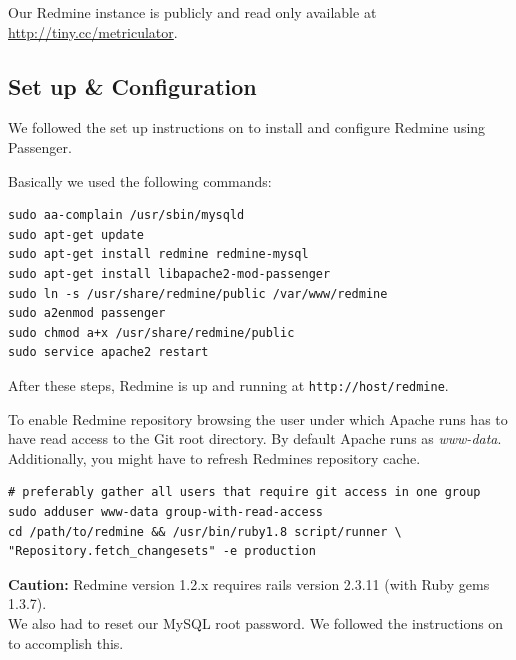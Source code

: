 \documentclass[11pt,a4paper,oneside]{scrreprt}
\begin{document}
Our Redmine instance is publicly and read only available at \url{http://tiny.cc/metriculator}.

\subsection{Set up \& Configuration}
We followed the set up instructions on \cite{redminesetup} to install and configure Redmine using Passenger.

Basically we used the following commands:
\begin{lstlisting}[style=console, caption=Redmine set up commands]
sudo aa-complain /usr/sbin/mysqld
sudo apt-get update
sudo apt-get install redmine redmine-mysql
sudo apt-get install libapache2-mod-passenger
sudo ln -s /usr/share/redmine/public /var/www/redmine
sudo a2enmod passenger
sudo chmod a+x /usr/share/redmine/public
sudo service apache2 restart
\end{lstlisting}

After these steps, Redmine is up and running at \texttt{http://host/redmine}.

To enable Redmine repository browsing the user under which Apache runs has to have read access to the Git root directory.
By default Apache runs as \textit{www-data}. Additionally, you might have to refresh Redmines repository cache.
\begin{lstlisting}[style=console, caption=Redmine repository browsing set up]
# preferably gather all users that require git access in one group
sudo adduser www-data group-with-read-access
cd /path/to/redmine && /usr/bin/ruby1.8 script/runner \
"Repository.fetch_changesets" -e production
\end{lstlisting}

\textbf{Caution:} Redmine version 1.2.x requires rails version 2.3.11 (with Ruby gems 1.3.7).\\
We also had to reset our MySQL root password. We followed the instructions on \cite{mysqlpasswordreset} to accomplish this.
\end{document}

